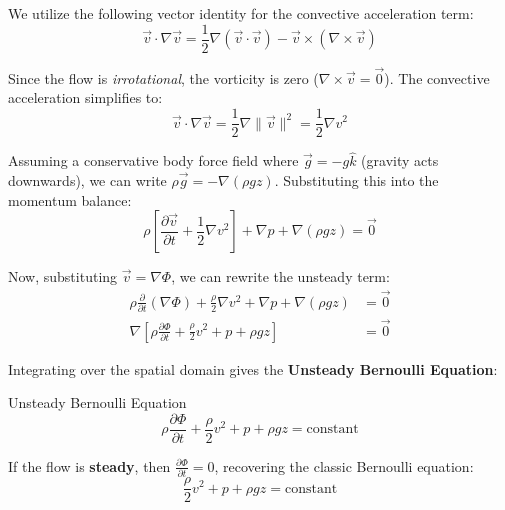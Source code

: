We utilize the following vector identity for the convective acceleration term:
\begin{equation}
    \vec{v} \cdot \nabla \vec{v} = \frac{1}{2} \nabla (\vec{v} \cdot \vec{v}) - \vec{v} \times (\nabla \times \vec{v})
\end{equation}

Since the flow is \textit{irrotational}, the vorticity is zero ($\nabla \times \vec{v} = \vec{0}$). The convective acceleration simplifies to:
\begin{equation}
    \vec{v} \cdot \nabla \vec{v} = \frac{1}{2} \nabla \lVert \vec{v} \rVert^2 = \frac{1}{2} \nabla v^2
\end{equation}

Assuming a conservative body force field where $\vec{g} = -g\hat{k}$ (gravity acts downwards), we can write $\rho \vec{g} = -\nabla (\rho g z)$. Substituting this into the momentum balance:
\begin{equation}
    \rho \left[ \frac{\partial \vec{v}}{\partial t} + \frac{1}{2} \nabla v^2 \right] + \nabla p + \nabla (\rho g z) = \vec{0}
\end{equation}

Now, substituting $\vec{v} = \nabla \Phi$, we can rewrite the unsteady term:
\begin{align*}
    \rho \frac{\partial}{\partial t}(\nabla \Phi) + \frac{\rho}{2} \nabla v^2 + \nabla p + \nabla(\rho g z) &= \vec{0} \\
    \nabla \left[ \rho \frac{\partial \Phi}{\partial t} + \frac{\rho}{2} v^2 + p + \rho g z \right] &= \vec{0}
\end{align*}

Integrating over the spatial domain gives the \textbf{Unsteady Bernoulli Equation}:
\begin{eqbox}{Unsteady Bernoulli Equation}
    \begin{equation}
        \rho \frac{\partial \Phi}{\partial t} + \frac{\rho}{2} v^2 + p + \rho g z = \text{constant}
    \end{equation}
\end{eqbox}

If the flow is \textbf{steady}, then $\frac{\partial \Phi}{\partial t} = 0$, recovering the classic Bernoulli equation:
\begin{equation}
    \frac{\rho}{2} v^2 + p + \rho g z = \text{constant}
\end{equation}

